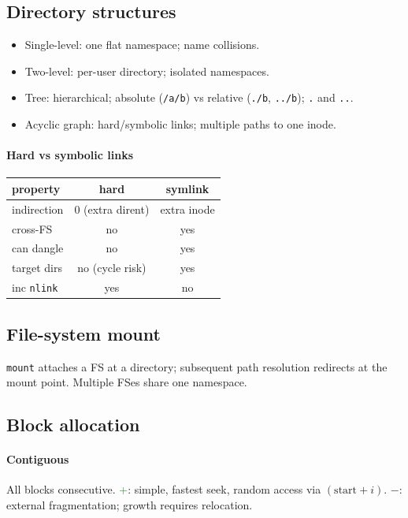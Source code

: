 \subsection{Directory structures}
\begin{itemize}
  \item \textcolor{Bittersweet}{Single-level}: one flat namespace; name collisions.
  \item \textcolor{Bittersweet}{Two-level}: per-user directory; isolated namespaces.
  \item \textcolor{Bittersweet}{Tree}: hierarchical; absolute (\texttt{/a/b}) vs relative (\texttt{./b}, \texttt{../b}); \texttt{.} and \texttt{..}.
  \item \textcolor{Bittersweet}{Acyclic graph}: hard/symbolic links; multiple paths to one inode.
\end{itemize}

\paragraph{Hard vs symbolic links}
\begin{tabular}{@{}lcc@{}}
\toprule
property & hard & symlink \\
\midrule
indirection & 0 (extra dirent) & extra inode \\
cross-FS & no & yes \\
can dangle & no & yes \\
target dirs & no (cycle risk) & yes \\
inc \texttt{nlink} & yes & no \\
\bottomrule
\end{tabular}

\subsection{File-system mount}
\texttt{mount} attaches a FS at a directory; subsequent path resolution redirects at the mount point. Multiple FSes share one namespace.

\subsection{Block allocation}
\paragraph{Contiguous} All blocks consecutive.
\textcolor{ForestGreen}{+}: simple, fastest seek, random access via $(\text{start}+i)$.
\textcolor{Bittersweet}{$-$}: external fragmentation; growth requires relocation.

